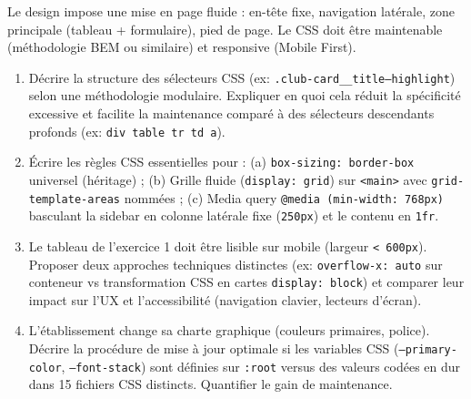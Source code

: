 \documentclass[11pt]{article}
\begin{document}
\begin{exercice}
Le design impose une mise en page fluide : en-tête fixe, navigation latérale, zone principale (tableau + formulaire), pied de page. Le CSS doit être maintenable (méthodologie BEM ou similaire) et responsive (Mobile First).

\begin{enumerate}
    \item Décrire la structure des sélecteurs CSS (ex: \texttt{.club-card\_\_title--highlight}) selon une méthodologie modulaire. Expliquer en quoi cela réduit la spécificité excessive et facilite la maintenance comparé à des sélecteurs descendants profonds (ex: \texttt{div table tr td a}).
    \item Écrire les règles CSS essentielles pour : (a) \texttt{box-sizing: border-box} universel (héritage) ; (b) Grille fluide (\texttt{display: grid}) sur \texttt{<main>} avec \texttt{grid-template-areas} nommées ; (c) Media query \texttt{@media (min-width: 768px)} basculant la sidebar en colonne latérale fixe (\texttt{250px}) et le contenu en \texttt{1fr}.
    \item Le tableau de l'exercice 1 doit être lisible sur mobile (largeur \texttt{< 600px}). Proposer deux approches techniques distinctes (ex: \texttt{overflow-x: auto} sur conteneur vs transformation CSS en cartes \texttt{display: block}) et comparer leur impact sur l'UX et l'accessibilité (navigation clavier, lecteurs d'écran).
    \item L'établissement change sa charte graphique (couleurs primaires, police). Décrire la procédure de mise à jour optimale si les variables CSS (\texttt{--primary-color}, \texttt{--font-stack}) sont définies sur \texttt{:root} versus des valeurs codées en dur dans 15 fichiers CSS distincts. Quantifier le gain de maintenance.
\end{enumerate}
\end{exercice}
\end{document}
